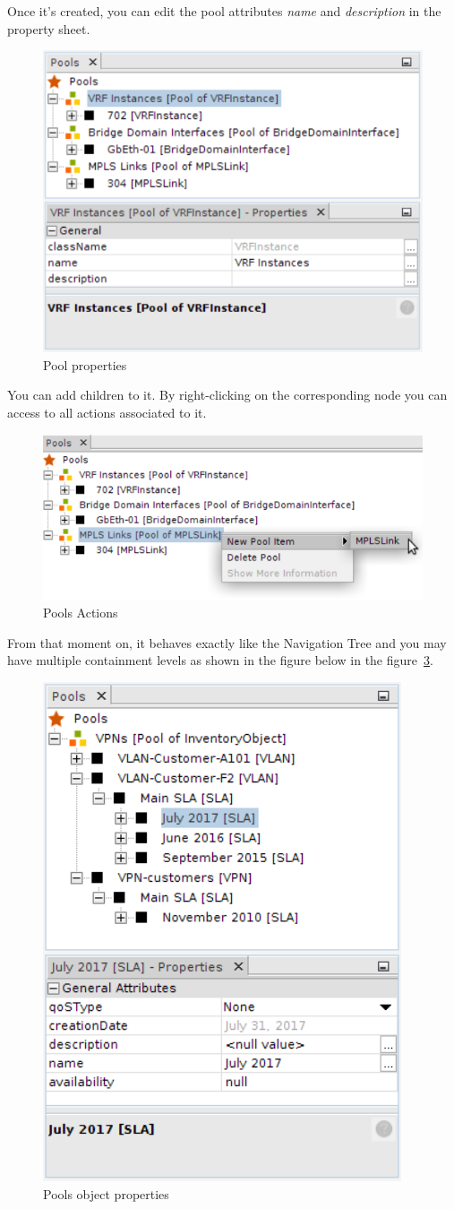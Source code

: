 \documentclass[a4paper]{article}
\begin{document}
	\newpage
	Once it's created, you can edit the pool attributes \textit{name} and \textit{description} in the property sheet.
	\begin{figure}[h!]
		\centering
		\includegraphics[width=0.5\linewidth]{img/pools_pool_properties.png}
		\caption{Pool properties}
		\label{fig:pools_pool_properties}
	\end{figure}
	
	You can add children to it. By right-clicking on the corresponding node you can access to all actions associated to it. 
	\begin{figure}[h!]
		\centering
		\includegraphics[width=0.5\linewidth]{img/pools_pool_action.png}
		\caption{Pools Actions}
		\label{fig:pools_pool_action}
	\end{figure}
	
	From that moment on, it behaves exactly like the Navigation Tree and you may have multiple containment levels as shown in the figure below in the figure~\ref{fig:pools_pool_object_properties}.	
	\begin{figure}[h!]
		\centering
		\includegraphics[width=0.3\linewidth]{img/pools_pool_object_properties.png}
		\caption{Pools object properties}
		\label{fig:pools_pool_object_properties}
	\end{figure}
				
\end{document}
